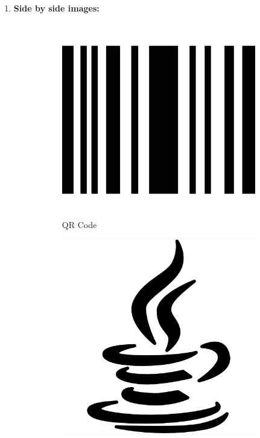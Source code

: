 \documentclass{article}
\begin{document}
\begin{enumerate}
        \item \textbf{Side by side images:} 
            \begin{figure}[h]
                \centering
                \begin{subfigure}{0.45\textwidth}
                    \centering
				    \includegraphics[width=\linewidth]{bar-code.png}
				    \caption{QR Code}
				    \label{qrcode}
                \end{subfigure}
                \hfill
                \begin{subfigure}{0.45\textwidth}
                    \centering
				    \includegraphics[width=\linewidth]{java.png}

\end{subfigure}
\end{figure}
\end{enumerate}
\end{document}
